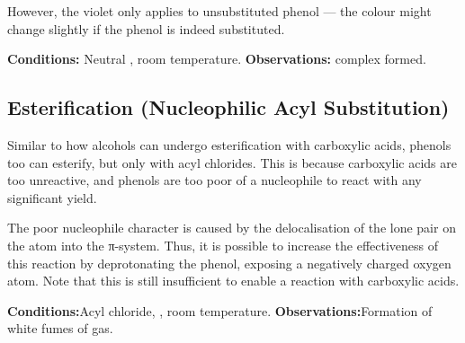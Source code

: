 			However, the violet only applies to unsubstituted phenol --- the colour might change slightly if the phenol is
			indeed substituted.

			\vspace{1.5em}
			\vbox{\textbf{Conditions:}	\tabto{35mm}Neutral , room temperature.}
			\vbox{\textbf{Observations:}\tabto{35mm} complex formed.}






		\subsection{Esterification (Nucleophilic Acyl Substitution)}

			Similar to how alcohols can undergo esterification with carboxylic acids, phenols too can esterify, but only with acyl
			chlorides. This is because carboxylic acids are too unreactive, and phenols are too poor of a nucleophile to react with any
			significant yield.

			The poor nucleophile character is caused by the delocalisation of the lone pair on the  atom into the π-system. Thus,
			it is possible to increase the effectiveness of this reaction by deprotonating the phenol, exposing a negatively charged oxygen
			atom. Note that this is still insufficient to enable a reaction with carboxylic acids.


			\vspace{1.5em}
			\vbox{\textbf{Conditions:}\tabto{35mm}Acyl chloride, , room temperature.}
			\vbox{\textbf{Observations:}\tabto{35mm}Formation of white fumes of  gas.}




